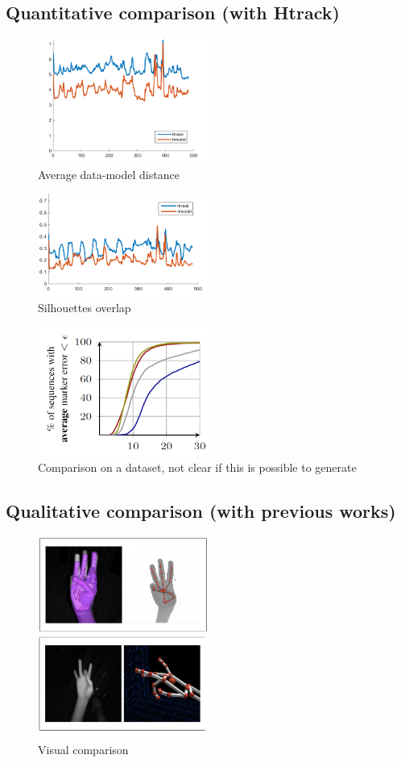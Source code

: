 \subsection{Quantitative comparison (with Htrack)}
\begin{figure}[h!] 
	\centering
	\includegraphics[width=0.5\textwidth]{fig/draft/draft_pull_error}
	\caption{Average data-model distance}
	\label{fig:modeling}
\end{figure}
\begin{figure}[h!] 
	\centering
	\includegraphics[width=0.5\textwidth]{fig/draft/draft_push_error}
	\caption{Silhouettes overlap}
	\label{fig:modeling}
\end{figure}
\begin{figure}[h!] 
	\centering
	\includegraphics[width=0.5\textwidth]{fig/draft/draft_hmodel_htrack_comparison}
	\caption{Comparison on a dataset, not clear if this is possible to generate}
	\label{fig:modeling}
\end{figure}

\subsection{Qualitative comparison (with previous works)}
\begin{figure}[h!] 
	\centering
	\includegraphics[width=0.5\textwidth]{fig/draft/draft_visual_comparison}
	\caption{Visual comparison}
	\label{fig:modeling}
\end{figure}